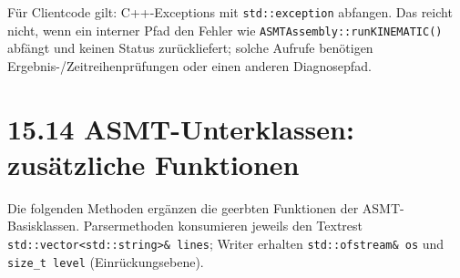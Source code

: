 \documentclass[
  12pt
]{book}
\begin{document}
Für Clientcode gilt: C++-Exceptions mit \texttt{std::exception}
abfangen. Das reicht nicht, wenn ein interner Pfad den Fehler wie
\texttt{ASMTAssembly::runKINEMATIC()} abfängt und keinen Status
zurückliefert; solche Aufrufe benötigen Ergebnis-/Zeitreihenprüfungen
oder einen anderen Diagnosepfad.

\hypertarget{asmt-unterklassen-zusuxe4tzliche-funktionen}{%
\section{\texorpdfstring{{15.14} ASMT-Unterklassen: zusätzliche
Funktionen}{15.14 ASMT-Unterklassen: zusätzliche Funktionen}}\label{asmt-unterklassen-zusuxe4tzliche-funktionen}}

Die folgenden Methoden ergänzen die geerbten Funktionen der
ASMT-Basisklassen. Parsermethoden konsumieren jeweils den Textrest
\texttt{std::vector\textless{}std::string\textgreater{}\&\ lines};
Writer erhalten \texttt{std::ofstream\&\ os} und \texttt{size\_t\ level}
(Einrückungsebene).
\end{document}
